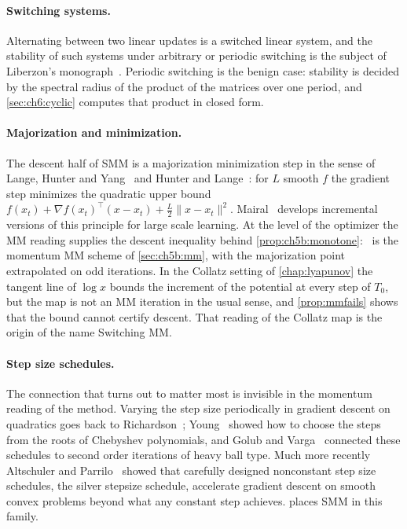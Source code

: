 \paragraph{Switching systems.} Alternating between two linear updates is a
switched linear system, and the stability of such systems under arbitrary or
periodic switching is the subject of Liberzon's monograph~\cite{liberzon2003}.
Periodic switching is the benign case: stability is decided by the spectral
radius of the product of the matrices over one period, and
\cref{sec:ch6:cyclic} computes that product in closed form.

\paragraph{Majorization and minimization.} The descent half of SMM is a
majorization minimization step in the sense of Lange, Hunter and
Yang~\cite{lange2000} and Hunter and Lange~\cite{hunter2004}: for $L$ smooth
$f$ the gradient step minimizes the quadratic upper bound
$f(x_t)+\nabla f(x_t)^\top(x-x_t)+\tfrac L2\|x-x_t\|^2$. Mairal~\cite{mairal2015}
develops incremental versions of this principle for large scale learning.
At the level of the optimizer the MM reading supplies the descent inequality behind \cref{prop:ch5b:monotone}: \smmdet\ is the momentum MM scheme of \cref{sec:ch5b:mm}, with the majorization point extrapolated on odd iterations.
In the Collatz
setting of \cref{chap:lyapunov} the tangent line of $\log x$ bounds the increment
of the potential at every step of $T_0$, but the map is not an MM iteration in
the usual sense, and \cref{prop:mmfails} shows that the bound cannot certify
descent. That reading of the Collatz map is the origin of the name Switching
MM.

\paragraph{Step size schedules.} The connection that turns out to matter most
is invisible in the momentum reading of the method.
Varying the step size
periodically in gradient descent on quadratics goes back to
Richardson~\cite{richardson1911}; Young~\cite{young1953} showed how to choose
the steps from the roots of Chebyshev polynomials, and Golub and
Varga~\cite{golub1961} connected these schedules to second order iterations of
heavy ball type. Much more recently Altschuler and Parrilo~\cite{altschuler2024}
showed that carefully designed nonconstant step size schedules, the silver
stepsize schedule, accelerate gradient descent on smooth convex problems beyond
what any constant step achieves.  places SMM in this family.

